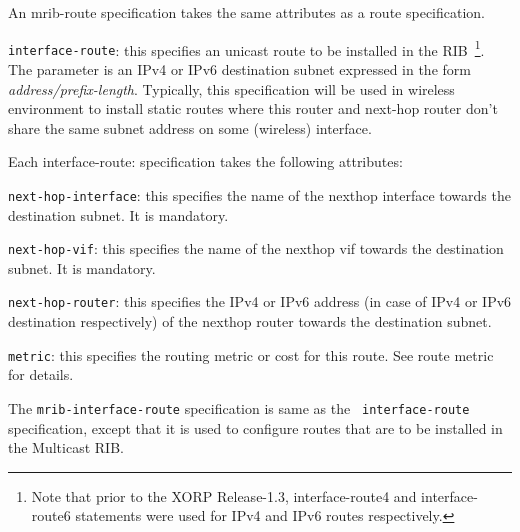 \begin{description}
  An {\stt mrib-route} specification takes the same attributes as a
  {\stt route} specification.

\item{\tt interface-route}: this specifies an unicast route to be
  installed in the RIB~\footnote{Note that prior to the XORP
  Release-1.3, interface-route4 and interface-route6 statements were
  used for IPv4 and IPv6 routes respectively.}.  The parameter is an
  IPv4 or IPv6 destination subnet expressed in the form {\it
  address/prefix-length}. Typically, this specification will be used in
  wireless environment to install static routes where this router and
  next-hop router don't share the same subnet address on some (wireless)
  interface.

  Each {\stt interface-route}: specification takes the following attributes:
\begin{description}
\item{\tt next-hop-interface}: this specifies the name of the nexthop
  interface towards the destination subnet. It is mandatory.
\item{\tt next-hop-vif}: this specifies the name of the nexthop
  vif towards the destination subnet. It is mandatory.
\item{\tt next-hop-router}: this specifies the IPv4 or IPv6 address (in
  case of IPv4 or IPv6 destination respectively) of the nexthop router
  towards the destination subnet.
\item{\tt metric}: this specifies the routing metric or cost for this
  route.  See {\stt route metric} for details.
\end{description}

\end{description}

The {\tt mrib-interface-route} specification is same as the {\tt
interface-route} specification, except that it is used to configure
routes that are to be installed in the Multicast RIB.

\newpage
